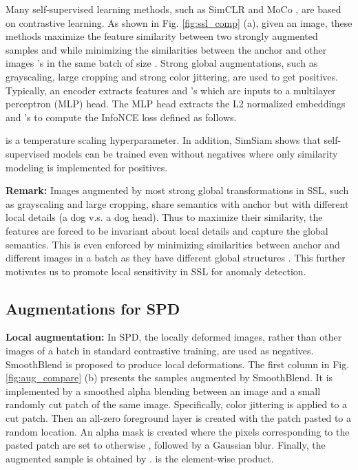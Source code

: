 \documentclass[runningheads]{llncs}
\begin{document}
Many self-supervised learning methods, such as SimCLR \cite{chen2020simple} and MoCo \cite{he2020momentum}, are based on contrastive learning. As shown in Fig. \ref{fig:ssl_comp} (a), given an image, these methods maximize the feature similarity between two strongly augmented samples  and  while minimizing the similarities between the anchor  and other images 's in the same batch of size . Strong global augmentations, such as grayscaling, large cropping and strong color jittering, are used to get positives. Typically, an encoder extracts features  and 's which are inputs to a multilayer perceptron (MLP) head. The MLP head extracts the L2 normalized embeddings  and 's to compute the InfoNCE loss defined as follows.

 is a temperature scaling hyperparameter. In addition, SimSiam \cite{chen2021exploring} shows that self-supervised models can be trained even without negatives where only similarity modeling is implemented for positives.

\noindent\textbf{Remark:} Images augmented by most strong global transformations in SSL, such as grayscaling and large cropping, share semantics with anchor but with different local details (a dog v.s. a dog head). Thus to maximize their similarity, the features are forced to be invariant about local details and capture the global semantics. This is even enforced by minimizing similarities between anchor and different images in a batch as they have different global structures \cite{chen2020simple,ericsson2021self}. This further motivates us to promote local sensitivity in SSL for anomaly detection.
\subsection{Augmentations for SPD}
\noindent\textbf{Local augmentation:} In SPD, the locally deformed images, rather than other images of a batch in standard contrastive training, are used as negatives. SmoothBlend is proposed to produce local deformations. The first column in Fig. \ref{fig:aug_compare} (b) presents the samples augmented by SmoothBlend. It is implemented by a smoothed alpha blending between an image and a small randomly cut patch of the same image. Specifically, color jittering is applied to a cut patch. Then an all-zero foreground layer  is created with the patch pasted to a random location. An alpha mask  is created where the pixels corresponding to the pasted patch are set to  otherwise , followed by a Gaussian blur. Finally, the augmented sample is obtained by .  is the element-wise product. 
\end{document}
